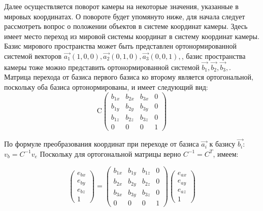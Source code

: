  Далее осуществляется поворот камеры на некоторые значения, указанные в мировых координатах. О повороте будет упомянуто ниже, для начала следует рассмотреть вопрос о положении объектов в системе координат камеры. Здесь имеет место переход из мировой системы координат в систему координат камеры. Базис мирового пространства может быть представлен ортонормированной системой векторов
 \begin{math}\vec{a_1}(1, 0, 0), \vec{a_2}(0, 1, 0), \vec{a_3}(0, 0, 1), \end{math}, базис пространства камеры тоже можно представить ортонормированной системой \begin{math}\vec{b_1}, \vec{b_2}, \vec{b_3}, \end{math}.
 Матрица перехода от базиса первого базиса ко второму является ортогональной, поскольку оба базиса ортонормированы, и имеет следующий вид:    
 \begin{equation} \mathrm{C}\begin{pmatrix}
    b_{1x} & b_{2x}  & b_{3x} & 0\\
    b_{1y} & b_{2y} & b_{3y} & 0\\
    b_{1z} & b_{2z} & b_{3z} & 0\\
    0 & 0 & 0 & 1
  \end{pmatrix}\end{equation}
  
  По формуле преобразования координат при переходе от базиса \begin{math}\vec{a_i}\end{math} к базису \begin{math} \vec{b_i}\end{math}:
  \begin{math}v_b = C^{-1}v_e\end{math}
  Поскольку для ортогональной матрицы верно \begin{math}C^{-1} = C^{T}\end{math}, имеем:
  
  \begin{equation}
  \begin{pmatrix}
    e_{bx}\\
    e_{by}\\
    e_{bz}\\
    1
  \end{pmatrix} = 
  \begin{pmatrix}
    b_{1x} & b_{1y}  & b_{1z} & 0\\
    b_{2x} & b_{2y} & b_{2z} & 0\\
    b_{3x} & b_{3y} & b_{3z} & 0\\
    0 & 0 & 0 & 1
  \end{pmatrix}
    \begin{pmatrix}
    e_{ax}\\
    e_{ay}\\
    e_{az}\\
    1
  \end{pmatrix}
  \end{equation}
  
